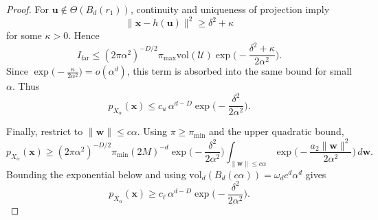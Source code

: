 \documentclass[12pt]{article}
\theoremstyle{definition} %
\newcommand{\x}{\bm x}
\begin{document}
\begin{proof}
For $\bm u\notin\Theta(B_d(r_1))$, continuity and uniqueness of projection imply
\[
\|\x-h(\bm u)\|^2\ge \delta^2+\kappa
\]
for some $\kappa>0$. Hence
\[
I_{\mathrm{far}}
\le
(2\pi\alpha^2)^{-D/2}
\pi_{\max}\mathrm{vol}(\mathcal U)
\exp\!\Big(-\frac{\delta^2+\kappa}{2\alpha^2}\Big).
\]
Since
$
\exp\!\Big(-\frac{\kappa}{2\alpha^2}\Big)=o(\alpha^d)$,
this term is absorbed into the same bound for small $\alpha$.
Thus
\[
p_{X_\alpha}(\x)
\le
c_u\,
\alpha^{d-D}
\exp\!\Big(-\frac{\delta^2}{2\alpha^2}\Big).
\]

Finally, restrict to $\|\bm w\|\le c\alpha$.
Using $\pi\ge\pi_{\min}$ and the upper quadratic bound,
\[
p_{X_\alpha}(\x)
\ge
(2\pi\alpha^2)^{-D/2}
\pi_{\min}(2M)^{-d}
\exp\!\Big(-\frac{\delta^2}{2\alpha^2}\Big)
\int_{\|\bm w\|\le c\alpha}
\exp\!\Big(-\frac{a_2\|\bm w\|^2}{2\alpha^2}\Big)\,d\bm w.
\]
Bounding the exponential below and using
$\mathrm{vol}_d(B_d(c\alpha))=\omega_d c^d\alpha^d$
gives
\[
p_{X_\alpha}(\x)
\ge
c_\ell\,
\alpha^{d-D}
\exp\!\Big(-\frac{\delta^2}{2\alpha^2}\Big).
\]
\end{proof}

\bigskip
\end{document}
